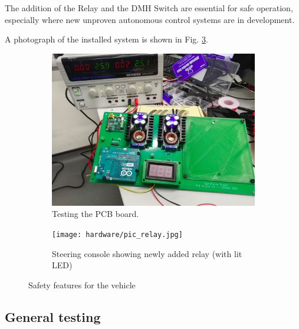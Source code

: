 \documentclass[a4paper]{article}
\begin{document}
The addition of the Relay and the DMH Switch are essential for safe operation, especially where new unproven autonomous control systems are in development.

A photograph of the installed system is shown in Fig. \ref{fig:relay}.

\begin{figure}
	\centering
	\begin{subfigure}{0.45\textwidth}
		\centering
		\includegraphics[width=0.75\columnwidth]{hardware/pcb_testing.png}
		\caption{Testing the PCB board.}
		\label{fig:pcb_testing}
	\end{subfigure}
	\quad
	\begin{subfigure}{0.45\textwidth}
		\centering
		\texttt{[image: hardware/pic\_relay.jpg]}
		\caption{Steering console showing newly added relay (with lit LED)}
		\label{fig:relay}
	\end{subfigure}
	\caption{Safety features for the vehicle}
	
\end{figure}


\subsection{General testing}\label{h.wbekh9ay82yu}

\end{document}
